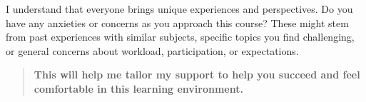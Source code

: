 \documentclass{ximera}
\author{Bart Snapp}
\begin{document}
\begin{question}
    I understand that everyone brings unique experiences and perspectives.
    Do you have any anxieties or concerns as you approach this course? These
    might stem from past experiences with similar subjects, specific topics you
    find challenging, or general concerns about workload, participation, or
    expectations.

    \begin{quote}
        \textbf{This will help me tailor my support to help you succeed and feel
            comfortable in this learning environment.}
    \end{quote}
        \begin{freeResponse}
    \end{freeResponse}
\end{question}
\end{document}
